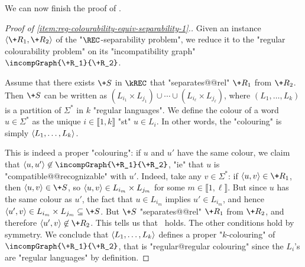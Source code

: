 We can now finish the proof of .

\begin{proof}[Proof of \eqref{item:reg-colourability-equiv-separability-1}.]
    \AP Given an instance $\tup{\+R_1,\+R_2}$ of the "$\REC$-separability problem", we
    reduce it to the "regular colourability problem" on its "incompatibility graph"
    $\incompGraph{\+R_1}{\+R_2}$.

    Assume that there exists $\+S$ in $\kREC$ that "separates@@rel" $\+R_1$ from $\+R_2$.
    Then $\+S$ can be written as $(L_{i_1}\times L_{j_1}) \cup \cdots \cup (L_{i_\ell}\times L_{j_\ell})$, 
    where $(L_1,\dotsc,L_k)$ is a partition of $\Sigma^*$ in $k$ "regular languages".
    We define the colour of a word $u \in \Sigma^*$ as the unique $i \in \lBrack 1,k \rBrack$
    "st" $u \in L_i$. In other words, the "colouring" is simply $\langle L_1,\dotsc,L_k\rangle$. 

    This is indeed a proper "colouring": if $u$ and $u'$ have the same colour,
    we claim that $\tup{u,u'} \not\in \incompGraph{\+R_1}{\+R_2}$, "ie" that
    $u$ is "compatible@@recognizable" with $u'$. Indeed, take any $v \in \Sigma^*$: if $\tup{u,v} \in \+R_1$,
    then $\tup{u,v} \in \+S$, so $\langle u,v\rangle \in L_{i_m}\times L_{j_m}$ for some $m \in \lBrack 1,\ell\rBrack$. But since $u$ has the same colour 
    as $u'$, the fact that $u \in L_{i_m}$ implies $u' \in L_{i_m}$, and hence 
    $\tup{u',v} \in L_{i_m}\times L_{j_m}\subseteq \+S$.
    But $\+S$ "separates@@rel" $\+R_1$ from $\+R_2$, and therefore $\tup{u',v} \not\in \+R_2$.
    This tells us that \compL\ holds. The other conditions hold by symmetry.
    We conclude that $\langle L_1,\dotsc,L_k\rangle$ defines
    a proper "$k$-colouring" of $\incompGraph{\+R_1}{\+R_2}$, that is "regular@regular colouring" since the $L_i$'s are "regular languages" by definition.


\end{proof}
